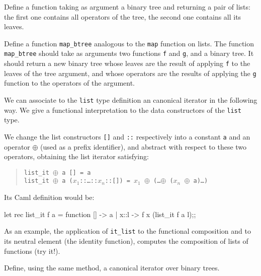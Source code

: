 \begin{exo}\label{Types:1}
Define a function taking as argument a binary tree and returning a pair of
lists: the first one contains all operators of the tree, the second
one contains all its leaves.
\end{exo}
\begin{exo}\label{Types:2}
Define a function \verb"map_btree" analogous to the {\tt map} function
on lists.
The function \verb"map_btree" should take as arguments two functions {\tt f}
and {\tt g}, and a binary tree. It should return a new binary tree whose
leaves are the result of applying {\tt f} to the leaves of the tree
argument, and whose operators are the results of applying the {\tt g}
function to the operators of the argument.
\end{exo}
\begin{exo}\label{Types:3}
We can associate to the {\tt list} type definition an canonical
iterator in the following way. We give a functional interpretation
to the data constructors of the {\tt list} type.

We change the list constructors {\tt []} and {\tt ::} respectively
into a constant {\tt a} and an operator $\oplus$ (used as a prefix
identifier), and abstract with respect to these two operators, obtaining
the list iterator satisfying:
\begin{quote}
\tt list\_it $\oplus$ a [] = a\\
\tt list\_it $\oplus$ a ($x_1$::\ldots::$x_n$::[]) = $x_1$ $\oplus$ (\ldots $\oplus$ ($x_n$ $\oplus$ a)\ldots)
\end{quote}
Its Caml definition would be:
\begin{caml_example}
let rec list_it f a = 
        function [] -> a
               | x::l -> f x (list_it f a l);;
\end{caml_example}
As an example, the application of \verb|it_list| to the functional
composition and to its neutral element (the identity function),
computes the composition of lists of functions (try it!).

Define, using the same method, a canonical iterator over binary trees.
\end{exo}
